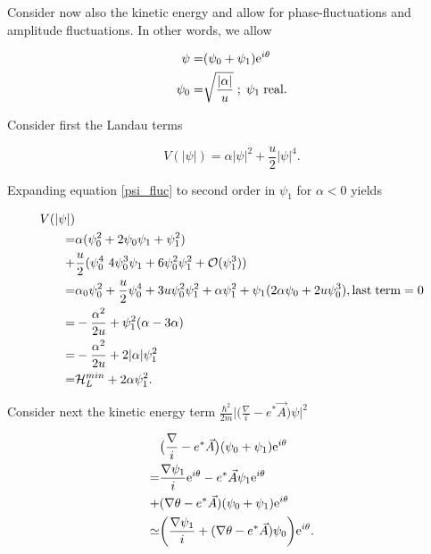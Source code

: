 Consider now also the kinetic energy and allow for phase-fluctuations and amplitude fluctuations. In other words, we allow 

\begin{equation}
\begin{aligned}
\psi =& (\psi_0 + \psi_1) \mathrm{e}^{i\theta}\\
\psi_0 =& \sqrt{\frac{|\alpha|}{u}} \; ; \; \psi_1 \; \mathrm{real}.
\label{psi_fluc}
\end{aligned}
\end{equation}


Consider first the Landau terms 

\begin{equation}
V(|\psi|) = \alpha |\psi|^2 + \frac{u}{2} |\psi|^4.
\label{V_psi}
\end{equation}

Expanding equation \eqref{psi_fluc} to second order in $\psi_1$ for $\alpha<0$ yields


\begin{equation}
\begin{aligned}
V(|\psi|) & \\
=& \alpha (\psi_0^2 + 2\psi_0 \psi_1 + \psi_1^2) \\
+& \frac{u}{2} (\psi_0^4  \ 4\psi_0^3 \psi_1 + 6 \psi_0^2 \psi_1^2 + \mathcal{O}(\psi_1^3)) \\
=& \alpha_0 \psi_0^2 + \frac{u}{2} \psi_0^4 + 3u\psi_0^2\psi_1^2 + \alpha \psi_1^2 + \psi_1(2\alpha\psi_0 + 2u\psi_0^3), \mathrm{last}  \; \mathrm{term} = 0 \\
=& -\frac{\alpha^2}{2u} + \psi_1^2(\alpha - 3\alpha) \\
=& -\frac{\alpha^2}{2u} + 2|\alpha| \psi_1^2 \\
=& \mathcal{H}_L^{min} + 2\alpha \psi_1^2.
\label{psi_fluc_expansion}
\end{aligned}
\end{equation}

Consider next the kinetic energy term $\frac{\hbar^2}{2m} \big|\big(\frac{\nabla}{i} - e^*\vec{A}\big)\psi \big|^2$

\begin{equation}
\begin{aligned}
& \big(\frac{\nabla}{i} - e^*\vec{A}\big)(\psi_0 + \psi_1) \mathrm{e}^{i\theta} \\
=& \frac{\nabla \psi_1}{i}  \mathrm{e}^{i\theta} - e^* \vec{A} \psi_1  \mathrm{e}^{i\theta} \\
+& (\nabla \theta - e^* \vec{A} )(\psi_0 + \psi_1)  \mathrm{e}^{i\theta} \\
\simeq&  \bigg(\frac{\nabla \psi_1}{i} + (\nabla \theta - e^* \vec{A} ) \psi_0 \bigg) \mathrm{e}^{i\theta}.
\label{psi_fluc_expansion_kin}
\end{aligned}
\end{equation}

